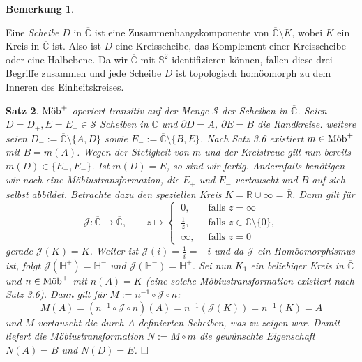 \documentclass[11pt]{book}
\numberwithin{dummy}{section}
\newtheorem{theorem}{Satz}[section]
\newtheorem{remark}[theorem]{Bemerkung}
\theoremstyle{nonumberbreak}
\newenvironment{defin}[1][]{\ifthenelse{\equal{#1}{}}{\definition}{\definition[#1]}\rm}{\enddefinition}
\newenvironment{pr}[1][]{\ifthenelse{\equal{#1}{}}{\proof}{\proof[#1]}\rm}{\endproof}
\newcommand{\C}{\mathbb{C}}
\newcommand{\CC}{\overline{\mathbb{C}}}
\newcommand{\la}{\longrightarrow}
\newcommand{\mob}{\textup{Möb}^+}
\begin{document}
\begin{spacing}{1.4}
\begin{remark}
\end{remark}

\begin{defin}     %
Eine \textit{Scheibe} $D$ in $\CC$ ist eine Zusammenhangskomponente von $\CC \setminus K$, wobei $K$ ein Kreis in $\CC$ ist. Also ist $D$ eine Kreisscheibe, das Komplement einer Kreisscheibe oder eine Halbebene. Da wir $\CC$ mit $\mathbb{S}^2$ identifizieren können, fallen diese drei Begriffe zusammen und jede Scheibe $D$ ist topologisch homöomorph zu dem Inneren des Einheitskreises.

\end{defin}

\begin{theorem}   %
$\mob$ operiert transitiv auf der Menge $\mathcal{S}$ der Scheiben in $\CC$.
\begin{pr}
Seien $D=D_+,E=E_+ \in \mathcal{S}$ Scheiben in $\CC$ und $\partial D = A$, $\partial E = B$ die Randkreise. weitere seien $D_- := \CC \setminus \{A, D\}$ sowie $E_- := \CC \setminus \{B, E\}$. Nach Satz 3.6 existiert $m \in \mob$ mit $B=m(A)$. Wegen der Stetigkeit von $m$ und der Kreistreue gilt nun bereits $m(D) \in \{E_+,E_-\}$. Ist $m(D) = E$, so sind wir fertig. Andernfalls benötigen wir noch eine Möbiustransformation, die $E_+$ und $E_-$ vertauscht und $B$ auf sich selbst abbildet. Betrachte dazu den speziellen Kreis $K= \mathbb{R} \cup \infty= \overline{\mathbb{R}}$. Dann gilt für
$$\mathcal{J}: \CC \la \CC, \qquad z \mapsto \begin{cases} \ 0, & \ \textrm{ falls } z = \infty \\ \ \frac{1}{z}, & \ \textrm{ falls } z \in \C \setminus \{0\}, \\ \ \infty, & \ \textrm{ falls } z=0 \end{cases}$$
gerade $\mathcal{J}(K)=K$. Weiter ist $\mathcal{J}(i)=\frac{1}{i} = -i$ und da $\mathcal{J}$ ein Homöomorphismus ist, folgt $\mathcal{J}(\mathbb{H}^{+}) = \mathbb{H}^-$ und $\mathcal{J}(\mathbb{H}^{-})= \mathbb{H}^{+}$. Sei nun $K_1$ ein beliebiger Kreis in $\CC$ und $n \in \mob$ mit $n(A)=K$ (eine solche Möbiustransformation existiert nach Satz 3.6). Dann gilt für $M:= n^{-1}\circ \mathcal{J} \circ n$:
$$M(A) = (n^{-1}\circ \mathcal{J} \circ n)(A) = n^{-1}(\mathcal{J}(K)) = n^{-1}(K) = A$$
und $M$ vertauscht die durch $A$ definierten Scheiben, was zu zeigen war. Damit liefert die Möbiustransformation $N:= M \circ m$ die gewünschte Eigenschaft $N(A)=B$ und $N(D)=E$. $\hfill \Box$
\end{pr}
\end{theorem}










\end{spacing}
\end{document}
